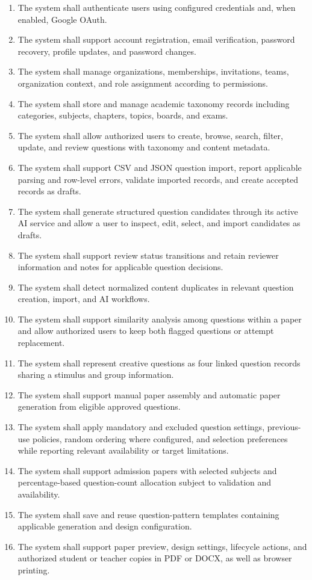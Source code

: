 \begin{enumerate}
    \item The system shall authenticate users using configured credentials and, when enabled, Google OAuth.
    \item The system shall support account registration, email verification, password recovery, profile updates, and password changes.
    \item The system shall manage organizations, memberships, invitations, teams, organization context, and role assignment according to permissions.
    \item The system shall store and manage academic taxonomy records including categories, subjects, chapters, topics, boards, and exams.
    \item The system shall allow authorized users to create, browse, search, filter, update, and review questions with taxonomy and content metadata.
    \item The system shall support CSV and JSON question import, report applicable parsing and row-level errors, validate imported records, and create accepted records as drafts.
    \item The system shall generate structured question candidates through its active AI service and allow a user to inspect, edit, select, and import candidates as drafts.
    \item The system shall support review status transitions and retain reviewer information and notes for applicable question decisions.
    \item The system shall detect normalized content duplicates in relevant question creation, import, and AI workflows.
    \item The system shall support similarity analysis among questions within a paper and allow authorized users to keep both flagged questions or attempt replacement.
    \item The system shall represent creative questions as four linked question records sharing a stimulus and group information.
    \item The system shall support manual paper assembly and automatic paper generation from eligible approved questions.
    \item The system shall apply mandatory and excluded question settings, previous-use policies, random ordering where configured, and selection preferences while reporting relevant availability or target limitations.
    \item The system shall support admission papers with selected subjects and percentage-based question-count allocation subject to validation and availability.
    \item The system shall save and reuse question-pattern templates containing applicable generation and design configuration.
    \item The system shall support paper preview, design settings, lifecycle actions, and authorized student or teacher copies in PDF or DOCX, as well as browser printing.
\end{enumerate}

